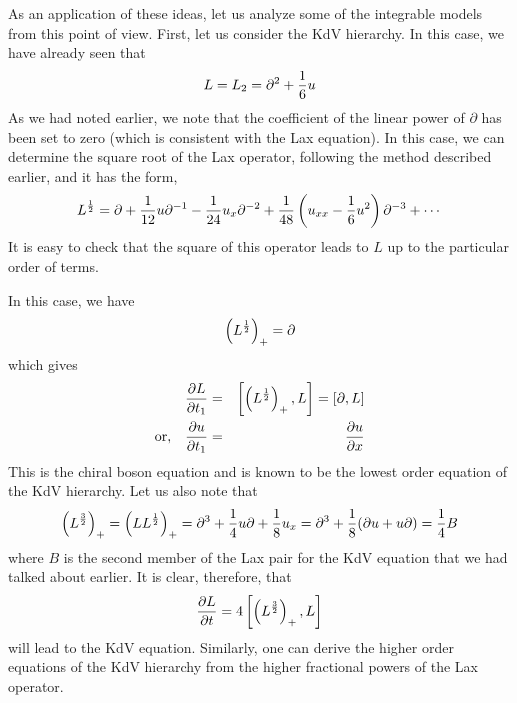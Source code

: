 \documentclass[a4paper,11pt]{article}
\begin{document}

As an application of these ideas, let us analyze some of the
integrable models from this point of view. First, let us consider the
KdV hierarchy. In this case, we have already seen that
\begin{equation}
L = L_{2} = \partial^{2} + {1\over 6} u
\end{equation}
As we had noted earlier, we note that the coefficient of the linear
power of $\partial$ has been set to zero (which is consistent with the
Lax equation). In this case, we can determine the square root of the
Lax operator, following the method described earlier, and it has the
form,
\begin{equation}
L^{1\over 2} = \partial + {1\over 12} u \partial^{-1} - {1\over 24}
u_{x} \partial^{-2} + {1\over 48} \left(u_{xx} - {1\over 6}
u^{2}\right) \partial^{-3} + \cdots
\end{equation}
It is easy to check that the square of this operator leads to $L$ up
to the particular order of terms.

In this case, we have
\begin{equation}
\left(L^{1\over 2}\right)_{+} = \partial
\end{equation}
which gives
\begin{eqnarray}
{\partial L\over \partial t_{1}} & = & \left[\left(L^{1\over
2}\right)_{+} , L\right] = \left[ \partial , L\right]\nonumber\\
{\rm or,}\quad {\partial u\over \partial t_{1}} & = & {\partial u\over
\partial x}
\end{eqnarray}
This is the chiral boson equation and is known to be the lowest order
equation of the KdV hierarchy. Let us also note that
\begin{equation}
\left(L^{3\over 2}\right)_{+} = \left(LL^{1\over 2}\right)_{+} =
\partial^{3} + {1\over 4} u\partial + {1\over 8} u_{x} = \partial^{3}
+ {1\over 8} (\partial u + u \partial) = {1\over 4} B
\end{equation}
where $B$ is the second member of the Lax pair for the KdV equation
that we had talked about earlier. It is clear, therefore, that
\begin{equation}
{\partial L\over \partial t} = 4 \left[\left(L^{3\over 2}\right)_{+} ,
L\right]
\end{equation}
will lead to the KdV equation. Similarly, one can derive the higher
order equations of the KdV hierarchy from the higher fractional powers
of the Lax operator.
\end{document}
